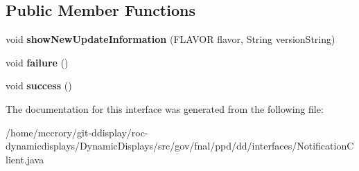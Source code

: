 \subsection*{Public Member Functions}
\begin{DoxyCompactItemize}
\item 
\hypertarget{interfacegov_1_1fnal_1_1ppd_1_1dd_1_1interfaces_1_1NotificationClient_ab0cf3325fec8142ebfe7babe9a6dcd41}{void {\bfseries show\-New\-Update\-Information} (F\-L\-A\-V\-O\-R flavor, String version\-String)}\label{interfacegov_1_1fnal_1_1ppd_1_1dd_1_1interfaces_1_1NotificationClient_ab0cf3325fec8142ebfe7babe9a6dcd41}

\item 
\hypertarget{interfacegov_1_1fnal_1_1ppd_1_1dd_1_1interfaces_1_1NotificationClient_a4f3a03aacbff763583e515a1bcdb4d66}{void {\bfseries failure} ()}\label{interfacegov_1_1fnal_1_1ppd_1_1dd_1_1interfaces_1_1NotificationClient_a4f3a03aacbff763583e515a1bcdb4d66}

\item 
\hypertarget{interfacegov_1_1fnal_1_1ppd_1_1dd_1_1interfaces_1_1NotificationClient_a6aa9aea7f841d3b3af77302d32aa2197}{void {\bfseries success} ()}\label{interfacegov_1_1fnal_1_1ppd_1_1dd_1_1interfaces_1_1NotificationClient_a6aa9aea7f841d3b3af77302d32aa2197}

\end{DoxyCompactItemize}


The documentation for this interface was generated from the following file\-:\begin{DoxyCompactItemize}
\item 
/home/mccrory/git-\/ddisplay/roc-\/dynamicdisplays/\-Dynamic\-Displays/src/gov/fnal/ppd/dd/interfaces/Notification\-Client.\-java\end{DoxyCompactItemize}
